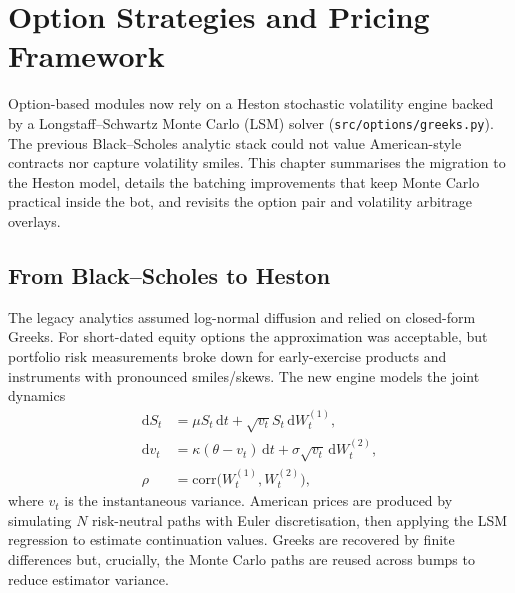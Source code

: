 \chapter{Option Strategies and Pricing Framework}

Option-based modules now rely on a Heston stochastic volatility engine backed by a Longstaff--Schwartz Monte Carlo (LSM) solver (\texttt{src/options/greeks.py}). The previous Black--Scholes analytic stack could not value American-style contracts nor capture volatility smiles. This chapter summarises the migration to the Heston model, details the batching improvements that keep Monte Carlo practical inside the bot, and revisits the option pair and volatility arbitrage overlays.

\section{From Black--Scholes to Heston}
The legacy analytics assumed log-normal diffusion and relied on closed-form Greeks. For short-dated equity options the approximation was acceptable, but portfolio risk measurements broke down for early-exercise products and instruments with pronounced smiles/skews. The new engine models the joint dynamics
\begin{align}
\mathrm{d}S_t &= \mu S_t\,\mathrm{d}t + \sqrt{v_t} S_t\,\mathrm{d}W_t^{(1)},\\
\mathrm{d}v_t &= \kappa(\theta - v_t)\,\mathrm{d}t + \sigma\sqrt{v_t}\,\mathrm{d}W_t^{(2)},\\
\rho &= \mathrm{corr}\bigl(W_t^{(1)}, W_t^{(2)}\bigr),
\end{align}
where $v_t$ is the instantaneous variance. American prices are produced by simulating $N$ risk-neutral paths with Euler discretisation, then applying the LSM regression to estimate continuation values. Greeks are recovered by finite differences but, crucially, the Monte Carlo paths are reused across bumps to reduce estimator variance.

